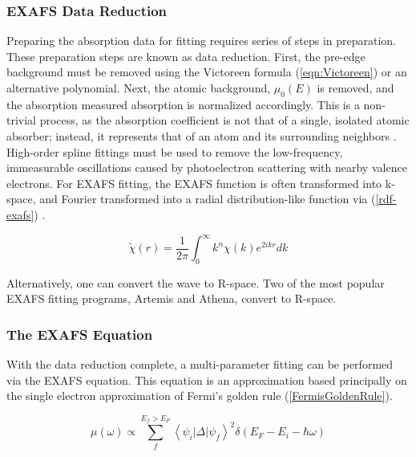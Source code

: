 \subsubsection{EXAFS Data Reduction}
Preparing the absorption data for fitting requires series of steps in preparation. These preparation steps are known as data reduction. First, the pre-edge background must be removed using the Victoreen formula (\ref{eqn:Victoreen}) or an alternative polynomial. Next, the atomic background, $ \mu_0(E) $  is removed, and the absorption measured absorption is normalized accordingly. This is a non-trivial process, as the absorption coefficient is not that of a single, isolated atomic absorber; instead, it represents that of an atom and its surrounding neighbors \cite{feff-exafs-theoretical}. High-order spline fittings must be used to remove the low-frequency, immeasurable oscillations caused by photoelectron scattering with nearby valence electrons. For EXAFS fitting, the EXAFS function is often transformed into k-space, and Fourier transformed into a radial distribution-like function via (\ref{rdf-exafs}) \cite{exafsbook}.

\begin{equation}
    \label{rdf-exafs}
    \widetilde{\chi}(r) = \frac{1}{2\pi} \int_{0}^{\infty }  k^n \chi(k) e^{2ikr} dk
\end{equation}

Alternatively, one can convert the wave to R-space. Two of the most popular EXAFS fitting programs, Artemis and Athena, convert to R-space.

\subsubsection{The EXAFS Equation}
With the data reduction complete, a multi-parameter fitting can be performed via the {EXAFS} equation. This equation is an approximation based principally on the single electron approximation of Fermi's golden rule (\ref{FermisGoldenRule}).

\begin{equation}
    \label{FermisGoldenRule}
    \mu(\omega) \varpropto  \sum_{f}^{E_f > E_F} \left\langle \psi_i \lvert \Delta \rvert \psi_f \right\rangle ^2 \delta (E_F - E_i - \hbar \omega)  
\end{equation}


